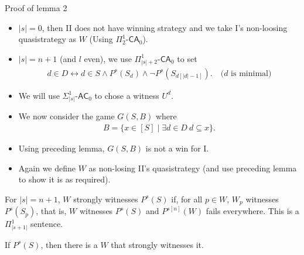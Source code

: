 \documentclass{beamer} %
\begin{document}

\begin{frame}{Proof of lemma 2}
    \begin{itemize}
        \item<1-> $|s| = 0$, then II does not have winning strategy and we take I's non-loosing 
        quasistrategy as $W$ (Using $\Pi^1_2$-$\mathsf{CA}_0$).
        \item<2-> $|s| = n + 1$ (and $l$ even), we use  $\Pi^1_{|s|+2}$-$\mathsf{CA}_0$ to set
        \begin{align*}
            d \in D \leftrightarrow d \in S \land P^s(S_d) \land \lnot P^s(S_{d[|d|-1]}). \quad 
            \text{($d$ is minimal)}
        \end{align*}
        \item<3-> We will use $\Sigma^1_{|s|}$-$\mathsf{AC}_0$ to chose a witness $U^d$.
        \item<4-> We now consider the game $G(S,B)$ where 
        \begin{align*}
            B = \{x \in [S] \mid \exists d \in D \ d \subseteq x\}.
        \end{align*}
        \item<5-> Using preceding lemma, $G(S,B)$ is not a win for I.
        \item<6-> Again we define $W$ as non-losing II's quasistrategy (and use preceding lemma to 
        show it is as required).
    \end{itemize}
\end{frame}


\begin{frame}
    \begin{definition}
        For $|s| = n+1$, $W$ strongly witnesses $P^s(S)$ if, for all $p \in W$, $W_p$ witnesses $P^s(S_p)$, that 
        is, $W$ witnesses $P^s(S)$ and $P^{s[n]}(W)$ fails everywhere. This is a $\Pi^1_{|s+1|}$ 
        sentence.
    \end{definition}
\end{frame}


\begin{frame} 
    \begin{lemma}[3]
        If $P^s(S)$, then there is a $W$ that strongly witnesses it.\label{enpowerment}
    \end{lemma}
\end{frame}
\end{document}
